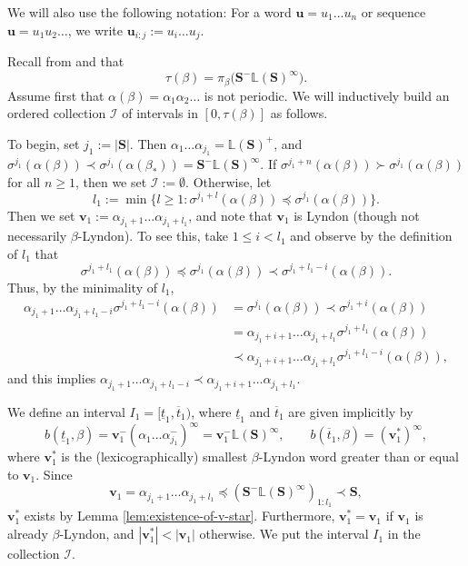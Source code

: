\documentclass[11pt]{amsart}
\theoremstyle{definition}
\theoremstyle{remark}
\numberwithin{equation}{section}
\renewcommand{\L}{\ensuremath{\mathbb{L}}}
\newcommand{\II}{\mathcal{I}}
\newcommand{\cs}{ {\mathbf{S}}}
\renewcommand{\u}{\mathbf{u}}
\renewcommand{\v}{\mathbf{v}}
\newcommand{\f}{\infty}
\newcommand{\al}{\alpha}
\newcommand{\lle}{\preccurlyeq}
\newcommand{\lge}{\succcurlyeq}
\newcommand{\si}{\sigma}
\begin{document}
We will also use the following notation: For a word $\u=u_1\dots u_n$ or sequence $\u=u_1u_2\dots$, we write $\u_{i:j}:=u_i\dots u_j$.

Recall from \cite[Theorem 2]{Allaart-Kong-2021} {and \cite[Theorem 3.4]{Allaart-Kong-2024}} that
\[
\tau(\beta)=\pi_\beta\big(\cs^-\L(\cs)^\f\big).
\]
Assume first that $\al(\beta)=\al_1\al_2\dots$ is not periodic. We will inductively build an ordered collection $\II$ of intervals in $[0,\tau(\beta)]$ as follows.

To begin, set $j_1:=|\cs|$. Then {$\al_1\ldots \al_{j_1}=\L(\cs)^+$, and} $\si^{j_1}(\al(\beta))\prec \si^{j_1}(\al(\beta_*))=\cs^-\L(\cs)^\f$. If $\si^{j_1+n}(\al(\beta))\succ \si^{j_1}(\al(\beta))$ for all $n\geq 1$, then we set $\II:=\emptyset$. Otherwise, let
\[
l_1:=\min\{l\geq 1: \si^{j_1+l}(\al(\beta))\lle \si^{j_1}(\al(\beta))\}.
\]
Then we set $\v_1:=\al_{j_1+1}\dots\al_{j_1+l_1}$, and note that $\v_1$ is Lyndon (though not necessarily $\beta$-Lyndon). To see this, take $1\leq i<l_1$ and observe by the definition of $l_1$ that
\[
\si^{j_1+l_1}(\al(\beta)) \lle \si^{j_1}(\al(\beta)) \prec \si^{j_1+l_1-i}(\al(\beta)).
\]
Thus, by the minimality of $l_1$,
\begin{align*}
\al_{j_1+1}\dots \al_{j_1+l_1-i} \si^{j_1+l_1-i}(\al(\beta)) &=\si^{j_1}(\al(\beta)) \prec \si^{j_1+i}(\al(\beta))\\
&= \al_{j_1+i+1}\dots\al_{j_1+l_1}\si^{j_1+l_1}(\al(\beta)) \\
&\prec \al_{j_1+i+1}\dots\al_{j_1+l_1} \si^{j_1+l_1-i}(\al(\beta)),
\end{align*}
and this implies $\al_{j_1+1}\dots \al_{j_1+l_1-i}\prec\al_{j_1+i+1}\dots\al_{{j_1+l_1}}$.

We define an interval $I_1=[\underline{t}_1,\overline{t}_1)$, where $\underline{t}_1$ and $\overline{t}_1$ are given implicitly by
\[
b(\underline{t}_1,\beta)=\v_1^-(\al_1\dots\al_{j_1}^-)^\f=\v_1^-\L(\cs)^\f, \qquad b(\overline{t}_1,\beta)=(\v_1^*)^\f,
\]
where $\v_1^*$ is the (lexicographically) smallest $\beta$-Lyndon word greater than or equal to $\v_1$. Since
\[
\v_1=\al_{j_1+1}\dots\al_{j_1+l_1}\lle (\cs^-\L(\cs)^\f)_{1:l_1}\prec \cs,
\]
$\v_1^*$ exists by Lemma \ref{lem:existence-of-v-star}. Furthermore, $\v_1^*=\v_1$ if $\v_1$ is already $\beta$-Lyndon, and $|\v_1^*|<|\v_1|$ otherwise.
We put the interval $I_1$ in the collection $\II$.
\end{document}
